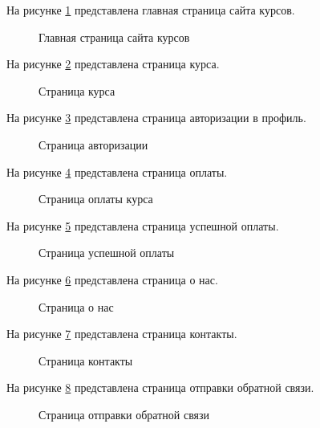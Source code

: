 На рисунке \ref{main:image} представлена главная страница сайта курсов.

\begin{figure}[H] %
	\caption{Главная страница сайта курсов}
	\label{main:image}
\end{figure}

На рисунке \ref{menu:image} представлена страница курса.

\begin{figure}[ht]
	\caption{Страница курса}
	\label{menu:image}
\end{figure}

\newpage
На рисунке \ref{enter:image} представлена страница авторизации в профиль.

\begin{figure}[ht]
	\caption{Страница авторизации}
	\label{enter:image}
\end{figure}

На рисунке \ref{pay:image} представлена страница оплаты.

\begin{figure}[ht]
	\caption{Страница оплаты курса}
	\label{pay:image}
\end{figure}

\newpage
На рисунке \ref{getpay:image} представлена страница успешной оплаты.

\begin{figure}[ht]
	\caption{Страница успешной оплаты}
	\label{getpay:image}
\end{figure}


На рисунке \ref{about:image} представлена страница о нас.

\begin{figure}[ht]
	\caption{Страница о нас}
	\label{about:image}
\end{figure}

\newpage
На рисунке \ref{contact:image} представлена страница контакты.

\begin{figure}[ht]
	\caption{Страница контакты}
	\label{contact:image}
\end{figure}

На рисунке \ref{mess:image} представлена страница отправки обратной связи.

\begin{figure}[ht]
	\caption{Страница отправки обратной связи}
	\label{mess:image}
\end{figure}

